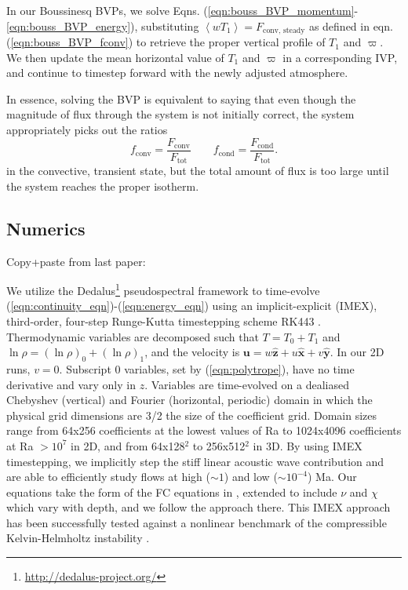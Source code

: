 \documentclass[aps, pre, onecolumn, nofootinbib, notitlepage, groupedaddress, amsfonts, amssymb, amsmath, longbibliography]{revtex4-1}
\newcommand{\angles}[1]{\ensuremath{\left\langle #1 \right\rangle}}
\begin{document}
In our Boussinesq BVPs, we solve Eqns. (\ref{eqn:bouss_BVP_momentum}-\ref{eqn:bouss_BVP_energy}),
substituting $\angles{wT_1} = F_{\text{conv, steady}}$ as defined in eqn. (\ref{eqn:bouss_BVP_fconv})
to retrieve the proper vertical profile of $T_1$ and $\varpi$.  We then update the mean horizontal value
of $T_1$ and $\varpi$ in a corresponding IVP, and continue to timestep forward with the newly adjusted
atmosphere.

In essence, solving the BVP is equivalent to saying that even though the magnitude of flux through
the system is not initially correct, the system appropriately picks out the ratios
\begin{equation}
f_{\text{conv}} = \frac{F_{\text{conv}}}{F_{\text{tot}}}\qquad
f_{\text{cond}} = \frac{F_{\text{cond}}}{F_{\text{tot}}}.
\end{equation}
in the convective, transient state, but the total amount of flux is too large until the system
reaches the proper isotherm.

\subsection{Numerics}
Copy+paste from last paper:

We utilize the 
Dedalus\footnote{\url{http://dedalus-project.org/}} 
pseudospectral framework \cite{burns&all2016} to time-evolve  
(\ref{eqn:continuity_eqn})-(\ref{eqn:energy_eqn}) 
using an implicit-explicit (IMEX), third-order, four-step 
Runge-Kutta timestepping scheme RK443 \cite{ascher&all1997}.  
Thermodynamic variables are decomposed such that $T = T_0 + T_1$ and
$\ln\rho = (\ln\rho)_0 + (\ln\rho)_1$, 
and the velocity is $\bm{u} = w\bm{\hat{z}} + u\bm{\hat{x}} + v\bm{\hat{y}}$.
In our 2D runs, $v = 0$.
Subscript 0 variables, set by (\ref{eqn:polytrope}), 
have no time derivative and vary only in $z$.
Variables are time-evolved on a dealiased Chebyshev (vertical)
and Fourier (horizontal, periodic) domain in which the
physical grid dimensions are 3/2 the size of the coefficient grid.  
Domain sizes range from
64x256 coefficients at the lowest values of 
Ra to 1024x4096 coefficients at Ra $> 10^{7}$ in 2D,
and from 64x128$^2$ to  256x512$^2$ in 3D. 
By using IMEX timestepping, we implicitly step the 
stiff linear acoustic wave contribution and are able to
efficiently study flows at high ($\sim 1$) 
and low ($\sim 10^{-4}$) Ma.  Our equations take the form
of the FC equations in \cite{lecoanet&all2014}, extended to include
$\nu$ and $\chi$ which vary with depth, and we follow the approach there.
This IMEX approach has been successfully 
tested against a nonlinear benchmark  of the compressible 
Kelvin-Helmholtz instability \cite{Lecoanet_et_al_2016_KH}.
\end{document}
